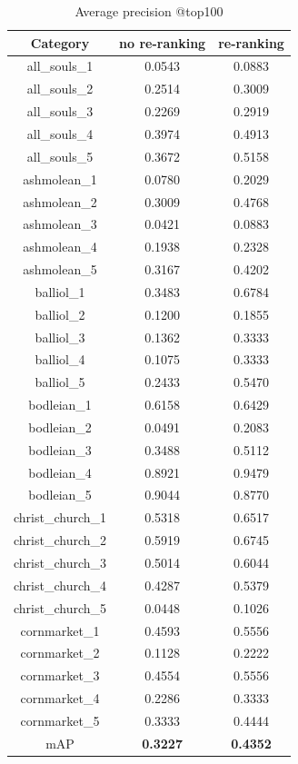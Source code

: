 \documentclass{acm_proc_article-sp}
\begin{document}
\begin{table}
\centering
\begin{tabular}{|c|c|c|} \hline
Category    & no re-ranking & re-ranking \\ \hline
all\_souls\_1  & 0.0543 & 0.0883 \\ \hline
all\_souls\_2  & 0.2514 & 0.3009 \\ \hline
all\_souls\_3  & 0.2269 & 0.2919 \\ \hline
all\_souls\_4  & 0.3974 & 0.4913 \\ \hline
all\_souls\_5  & 0.3672 & 0.5158 \\ \hline
ashmolean\_1   & 0.0780 & 0.2029 \\ \hline
ashmolean\_2   & 0.3009 & 0.4768 \\ \hline
ashmolean\_3   & 0.0421 & 0.0883 \\ \hline
ashmolean\_4   & 0.1938 & 0.2328\\ \hline
ashmolean\_5   & 0.3167 & 0.4202\\ \hline
balliol\_1     & 0.3483 & 0.6784\\ \hline
balliol\_2     & 0.1200 & 0.1855\\ \hline
balliol\_3     & 0.1362 & 0.3333\\ \hline
balliol\_4     & 0.1075 & 0.3333\\ \hline
balliol\_5     & 0.2433 & 0.5470\\ \hline
bodleian\_1    & 0.6158 & 0.6429\\ \hline
bodleian\_2    & 0.0491 & 0.2083\\ \hline
bodleian\_3    & 0.3488 & 0.5112\\ \hline
bodleian\_4    & 0.8921 & 0.9479\\ \hline
bodleian\_5    & 0.9044 & 0.8770\\ \hline
christ\_church\_1  & 0.5318 & 0.6517\\ \hline
christ\_church\_2  & 0.5919 & 0.6745\\ \hline
christ\_church\_3  & 0.5014 & 0.6044\\ \hline
christ\_church\_4  & 0.4287 & 0.5379\\ \hline
christ\_church\_5  & 0.0448 & 0.1026\\ \hline
cornmarket\_1  & 0.4593 &  0.5556\\ \hline
cornmarket\_2  & 0.1128 &  0.2222\\ \hline
cornmarket\_3  & 0.4554 &  0.5556\\ \hline
cornmarket\_4  & 0.2286 &  0.3333\\ \hline
cornmarket\_5  & 0.3333 &  0.4444\\ \hline
mAP         & \textbf{0.3227} & \textbf{0.4352}\\ \hline
\end{tabular}
\caption{Average precision @top100}
\end{table}
\end{document}
